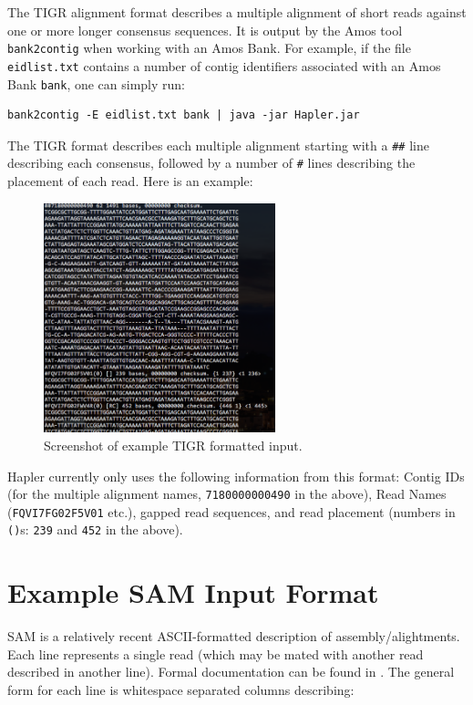 \documentclass[11pt]{llncs}
\begin{document}
The TIGR alignment format describes a multiple alignment of short reads against one or more longer consensus sequences. It is output by the Amos
tool \texttt{bank2contig} when working with an Amos Bank. 
For example, if the file \texttt{eidlist.txt} contains a number of contig identifiers
associated with an Amos Bank \texttt{bank}, one can simply run:

\begin{verbatim}
bank2contig -E eidlist.txt bank | java -jar Hapler.jar
\end{verbatim}

The TIGR format describes each multiple alignment starting with a \verb=##= line describing each consensus, followed by a number of \verb=#=
lines describing the placement of each read. Here is an example:

\begin{figure}[!h]
\centering
   \includegraphics[width=0.6\textwidth]{graphics/Example_tigr}
   \caption{Screenshot of example TIGR formatted input.}
   \label{exampleTIGR}
\end{figure}

Hapler currently only uses the following information from this format:  Contig IDs (for the multiple alignment names, \texttt{7180000000490} in the above),
Read Names (\texttt{FQVI7FG02F5V01} etc.), gapped read sequences, and read placement (numbers in \texttt{()}s: \texttt{239} and \texttt{452} in the above).

\newpage
\section{Example SAM Input Format}
\label{exampleSamInputFormat}

SAM is a relatively recent ASCII-formatted description of assembly/alightments. Each line represents a single read (which may be mated with another
read described in another line). Formal documentation can be found in \cite{LI2009}. The general form for each line is whitespace separated columns 
describing:
\end{document}

